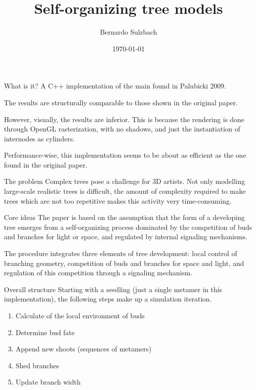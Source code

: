 \documentclass{beamer}
\title{Self-organizing tree models}
\author{Bernardo Sulzbach}
\date{\today}
\begin{document}
\begin{frame}
\titlepage
\end{frame}


\begin{frame}{What is it?}
A C++ implementation of the main found in Palubicki 2009.


The results are structurally comparable to those shown in the original paper.

However, visually, the results are inferior. This is because the rendering is done through OpenGL rasterization, with no shadows, and just the instantiation of internodes as cylinders.

Performance-wise, this implementation seems to be about as efficient as the one found in the original paper.
\end{frame}


\begin{frame}{The problem}
Complex trees pose a challenge for 3D artists. Not only modelling large-scale realistic trees is difficult, the amount of complexity required to make trees which are not too repetitive makes this activity very time-consuming.
\end{frame}


\begin{frame}{Core ideas}
The paper is based on the assumption that the form of a developing tree emerges from a self-organizing process dominated by the competition of buds and branches for light or space, and regulated by internal signaling mechanisms.

The procedure integrates three elements of tree development: local control of branching geometry, competition of buds and branches for space and light, and regulation of this competition through a signaling mechanism.
\end{frame}


\begin{frame}{Overall structure}
Starting with a seedling (just a single metamer in this implementation), the following steps make up a simulation iteration.

\begin{enumerate}
\item Calculate of the local environment of buds
\item Determine bud fate
\item Append new shoots (sequences of metamers)
\item Shed branches
\item Update branch width
\end{enumerate}
\end{frame}
\end{document}
